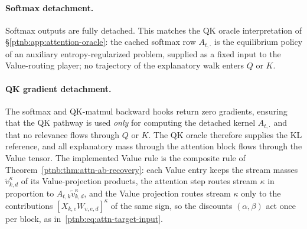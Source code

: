 \paragraph{Softmax detachment.}
Softmax outputs are fully detached. This matches the QK oracle interpretation of
\S\ref{ptnb:app:attention-oracle}: the cached softmax row $A_{t,\cdot}$ is the equilibrium policy of an
auxiliary entropy-regularized problem, supplied as a fixed input to the Value-routing player; no
trajectory of the explanatory walk enters $Q$ or $K$.

\paragraph{QK gradient detachment.}\label{ptnb:app:attention-grad-detach}
The softmax and QK-matmul backward hooks return zero gradients, ensuring that the QK pathway is
used \emph{only} for computing the detached kernel $A_{t,\cdot}$ and that no relevance flows
through $Q$ or $K$. The QK oracle therefore supplies the KL reference, and all explanatory mass
through the attention block flows through the Value tensor. The implemented Value rule is the
composite rule of Theorem~\ref{ptnb:thm:attn-ab-recovery}: each Value entry keeps the stream masses
$\tilde v^\kappa_{k,d}$ of its Value-projection products, the attention step routes stream $\kappa$
in proportion to $A_{t,k}\tilde v^\kappa_{k,d}$, and the Value projection routes stream $\kappa$
only to the contributions $[X_{k,e}W_{v,e,d}]^\kappa$ of the same sign, so the discounts
$(\alpha,\beta)$ act once per block, as in~\eqref{ptnb:eq:attn-target-input}. 


